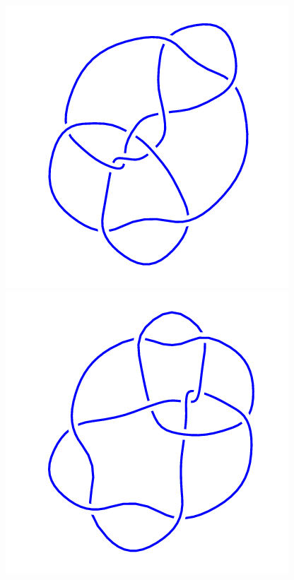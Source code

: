 \begin{figure}[H]
    \begin{minipage}[b]{.18\linewidth}
        \centering
        \includegraphics[width=\linewidth]{../data/10_92.png}
    \end{minipage}
    \begin{minipage}[b]{.18\linewidth}
        \centering
        \includegraphics[width=\linewidth]{../data/10_93.png}

\end{minipage}
\end{figure}

